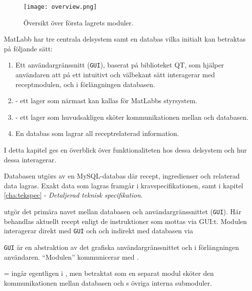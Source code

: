 
\begin{figure}[h]
\centering
\texttt{[image: overview.png]}
\caption{Översikt över första lagrets moduler.}
\label{fig:overview}
\end{figure}

MatLabb har tre centrala delsystem samt en databas vilka initialt kan betraktas på följande sätt: 
\begin{enumerate}
  \item Ett användargränssnitt (\verb=GUI=), baserat på biblioteket QT, som hjälper användaren att på ett intuitivt och välbekant sätt interagerar med receptmodulen, och i förlängningen databasen.
  \item \Shell - ett lager som närmast kan kallas för MatLabbs styrsystem.
  \item \Lookup - ett lager som huvudsakligen sköter kommunikationen mellan \Shell och databasen. 
  \item En databas som lagrar all receptrelaterad information.
\end{enumerate}
I detta kapitel ges en överblick över funktionaliteten hos dessa delsystem och hur dessa interagerar.

Databasen utgörs av en MySQL-databas där recept, ingredienser och relaterad data lagras. Exakt data som lagras framgår i kravspecifikationen, samt i kapitel \ref{cha:tekspec} - \emph{Detaljerad teknisk specifikation}.

\Shell utgör det primära navet mellan databasen och användargränssnittet (\verb=GUI=). Här behandlas aktuellt recept enligt de instruktioner som mottas via GUI:t. Modulen interagerar direkt med \verb=GUI= och \Lookup och indirekt med databasen via \Lookup

\verb=GUI= är en abstraktion av det grafiska användargränssnittet och i förlängningen användaren. ``Modulen'' kommunicerar med \Shell.

\Lookup{}= ingår egentligen i \Shell{}, men betraktat som en separat modul sköter den kommunikationen mellan databasen och \Shell{}s övriga interna submoduler.
